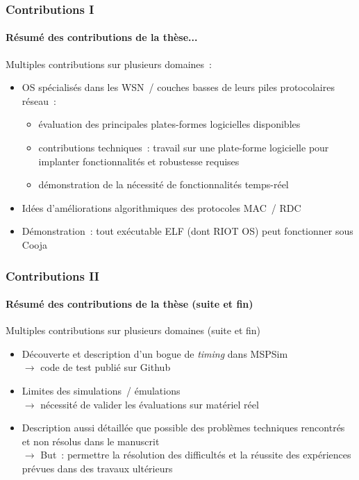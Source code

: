 \documentclass[10pt,c]{beamer}
\newcommand{\lang}[1]{\textit{#1}}
\begin{document}
\begin{frame}[label=ConclusionsContribs1]
\frametitle{Contributions I}
\framesubtitle{Résumé des contributions de la thèse...}

\begin{exampleblock}{Multiples contributions sur plusieurs domaines~:}
\begin{itemize}
\item OS spécialisés dans les WSN~/ couches basses de leurs piles
       protocolaires réseau~:
  \begin{itemize}
  \item évaluation des principales plates-formes logicielles disponibles
  \item contributions techniques~: travail sur une plate-forme logicielle
        pour implanter fonctionnalités et robustesse requises
  \item démonstration de la nécessité de fonctionnalités temps-réel
  \end{itemize}
\item Idées d'améliorations algorithmiques des protocoles MAC~/ RDC
\item Démonstration~: tout exécutable ELF (dont RIOT OS) peut fonctionner
       sous Cooja 
\end{itemize}
\end{exampleblock}

\end{frame}

\begin{frame}[label=ConclusionsContribs2]
\frametitle{Contributions II}
\framesubtitle{Résumé des contributions de la thèse (suite et fin)}

\begin{exampleblock}{Multiples contributions sur plusieurs domaines
                     (suite et fin)}
\begin{itemize}
\item Découverte et description d'un bogue de \lang{timing} dans MSPSim \\
      $\rightarrow$ code de test publié sur Github
\item Limites des simulations~/ émulations \\ 
      $\rightarrow$ nécessité de valider les évaluations sur matériel réel
\item Description aussi détaillée que possible des problèmes techniques
      rencontrés et non résolus dans le manuscrit \\
      $\rightarrow$ But~: permettre la résolution des difficultés et la
       réussite des expériences prévues dans des travaux ultérieurs
\end{itemize}
\end{exampleblock}

\end{frame}
\end{document}
